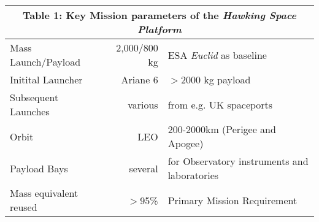 \documentclass[a4paper,12pt]{texMemo}
\begin{document}
  \begin{table}
\begin{center}
  \begin{tabular}{lrl}
    \multicolumn{3}{c}{Table 1: Key Mission parameters of the \textit{Hawking Space Platform}} \\
    \midrule 
    Mass Launch/Payload	             & 2,000/800 kg & ESA \textit{Euclid} as baseline \\
    Initital Launcher                &	Ariane 6 & $>$2000 kg payload \\
    Subsequent Launches     &  various & from e.g. UK spaceports \\
    Orbit & LEO & 200-2000km (Perigee and Apogee) \\
    Payload Bays  & several & for Observatory instruments and laboratories \\
    Mass equivalent reused & $>$95\% & Primary Mission Requirement \\
    \bottomrule
  \end{tabular}
  \end{center}
  \end{table}
  \vspace{-18pt}
  
\end{document}
